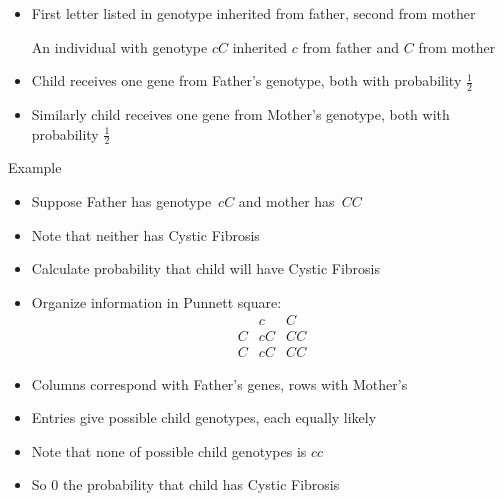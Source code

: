 \documentclass[handout]{beamer}
\theoremstyle{definition}
\begin{document}
\begin{frame}
\begin{itemize}
\item First letter listed in genotype
inherited from father, second from mother
\begin{example}
An individual with genotype $cC$ inherited
$c$ from father and $C$ from mother
\end{example}
\item Child receives one gene from Father's genotype,
both with probability $\frac{1}{2}$
\item Similarly child receives one gene from Mother's genotype,
both with probability $\frac{1}{2}$
\end{itemize}
\end{frame}

\begin{frame}{Example}
\begin{itemize}
\item Suppose Father has genotype~$cC$ and mother has~$CC$
\item Note that neither has Cystic Fibrosis
\item Calculate probability that child will have Cystic Fibrosis
\item Organize information in \alert{Punnett square}:
\[\begin{array}{c|cc}
&c&C\\\hline
C&cC&CC\\
C&cC&CC
\end{array}\]
\item Columns correspond with Father's genes, rows with Mother's
\item Entries give possible child genotypes, each equally likely
\item Note that \alert{none} of possible child genotypes is $cc$
\item So $0$ the probability that child has Cystic Fibrosis
\end{itemize}
\end{frame}
\end{document}
